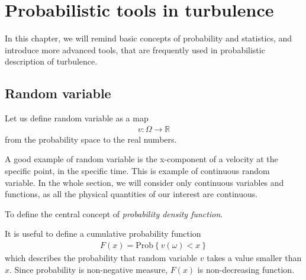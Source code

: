\chapter{Probabilistic tools in turbulence}
In this chapter, we will remind basic concepts of probability and statistics, and introduce more advanced tools, that are frequently used in probabilistic description of turbulence. 


%
%
%
%
%
%
%
\section{Random variable}

Let us define random variable as a map
\begin{align}
v: \Omega \rightarrow \mathbb{R}
\end{align}
from the probability space to the real numbers.

A good example of random variable is the x-component of a velocity at the specific point, in the specific time. This is example of continuous random variable. In the whole section, we will consider only continuous variables and functions, as all the physical quantities of our interest are continuous.

\bigskip
To define the central concept of \textit{probability density function}.

It is useful to define a cumulative probability function
\begin{align}
F(x) = \mathrm{Prob}\left\{v(\omega) < x\right\}
\end{align}
which describes the probability that random variable $v$ takes a value smaller than $x$. Since probability is non-negative measure, $F(x)$ is non-decreasing function. 


